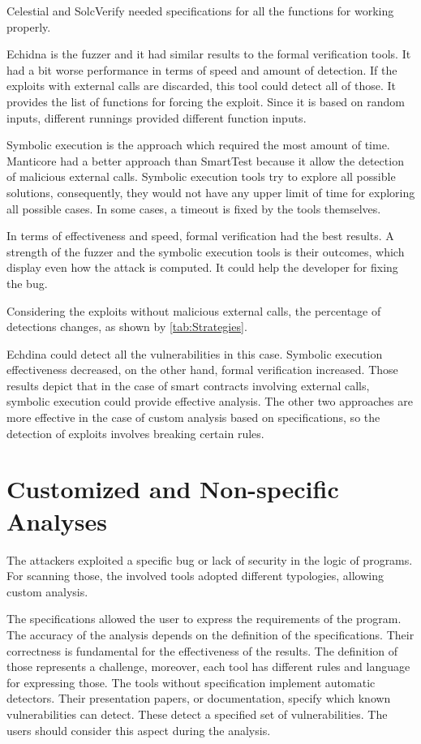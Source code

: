 Celestial and SolcVerify needed specifications for all the functions for working properly. 

Echidna is the fuzzer and it had similar results to the formal verification tools. 
It had a bit worse performance in terms of speed and amount of detection. If the exploits with external calls are discarded, this tool could detect all of those. 
It provides the list of functions for forcing the exploit. Since it is based on random inputs, different runnings provided different function inputs.

Symbolic execution is the approach which required the most amount of time. Manticore had a better approach than SmartTest because it allow the detection of malicious external calls. 
Symbolic execution tools try to explore all possible solutions, consequently, they would not have any upper limit of time for exploring all possible cases. 
In some cases, a timeout is fixed by the tools themselves.

In terms of effectiveness and speed, formal verification had the best results.
A strength of the fuzzer and the symbolic execution tools is their outcomes, which display even how the attack is computed. It could help the developer for fixing the bug.

Considering the exploits without malicious external calls, the percentage of detections changes, as shown by \autoref{tab:Strategies}.

Echdina could detect all the vulnerabilities in this case. 
Symbolic execution effectiveness decreased, on the other hand, formal verification increased. 
Those results depict that in the case of smart contracts involving external calls, symbolic execution could provide effective analysis.
The other two approaches are more effective in the case of custom analysis based on specifications, so the detection of exploits involves breaking certain rules. 


\section{Customized and Non-specific Analyses} 
The attackers exploited a specific bug or lack of security in the logic of programs. For scanning those, the involved tools adopted different typologies, allowing custom analysis. 

The specifications allowed the user to express the requirements of the program. The accuracy of the analysis depends on the definition of the specifications. 
Their correctness is fundamental for the effectiveness of the results. 
The definition of those represents a challenge, moreover, each tool has different rules and language for expressing those.
The tools without specification implement automatic detectors. 
Their presentation papers, or documentation, specify which known vulnerabilities can detect. These detect a specified set of vulnerabilities. 
The users should consider this aspect during the analysis. 

